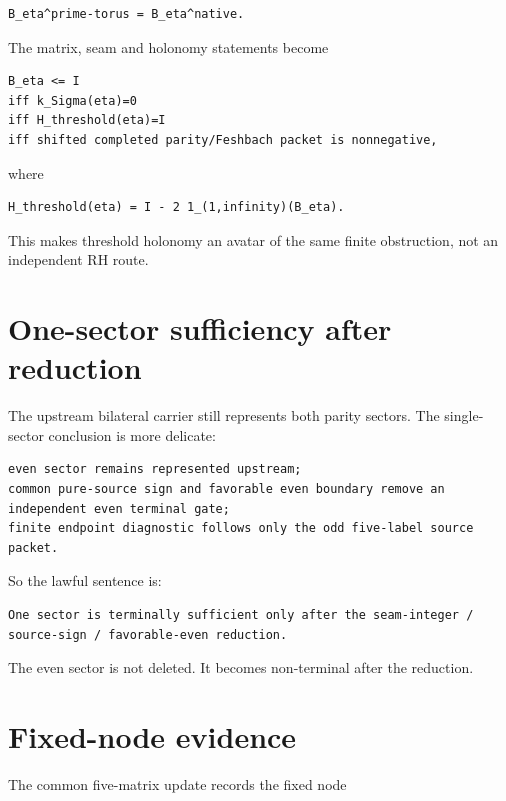 \begin{verbatim}
B_eta^prime-torus = B_eta^native.
\end{verbatim}

The matrix, seam and holonomy statements become

\begin{verbatim}
B_eta <= I
iff k_Sigma(eta)=0
iff H_threshold(eta)=I
iff shifted completed parity/Feshbach packet is nonnegative,
\end{verbatim}

where

\begin{verbatim}
H_threshold(eta) = I - 2 1_(1,infinity)(B_eta).
\end{verbatim}

This makes threshold holonomy an avatar of the same finite obstruction, not an independent RH route.

\hypertarget{one-sector-sufficiency-after-reduction}{%
\section{One-sector sufficiency after reduction}\label{one-sector-sufficiency-after-reduction}}

The upstream bilateral carrier still represents both parity sectors. The single-sector conclusion is more delicate:

\begin{verbatim}
even sector remains represented upstream;
common pure-source sign and favorable even boundary remove an independent even terminal gate;
finite endpoint diagnostic follows only the odd five-label source packet.
\end{verbatim}

So the lawful sentence is:

\begin{verbatim}
One sector is terminally sufficient only after the seam-integer / source-sign / favorable-even reduction.
\end{verbatim}

The even sector is not deleted. It becomes non-terminal after the reduction.

\hypertarget{fixed-node-evidence}{%
\section{Fixed-node evidence}\label{fixed-node-evidence}}

The common five-matrix update records the fixed node

